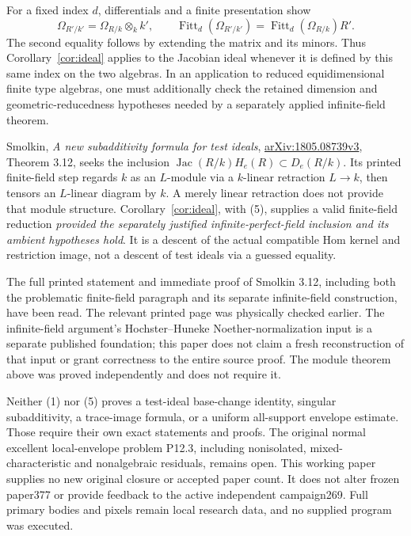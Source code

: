\documentclass[11pt]{article}
\newcommand{\Fitt}{\operatorname{Fitt}}
\begin{document}
For a fixed index $d$, differentials and a finite presentation show
\[
 \Omega_{R'/k'}=\Omega_{R/k}\otimes_k k',\qquad
 \Fitt_d(\Omega_{R'/k'})=\Fitt_d(\Omega_{R/k})R'.          \tag{5}
\]
The second equality follows by extending the matrix and its minors.
Thus Corollary~\ref{cor:ideal} applies to the Jacobian ideal whenever
it is defined by this same index on the two algebras. In an application
to reduced equidimensional finite type algebras, one must additionally
check the retained dimension and geometric-reducedness hypotheses
needed by a separately applied infinite-field theorem.

Smolkin, \emph{A new subadditivity formula for test ideals},
\href{https://arxiv.org/abs/1805.08739v3}{arXiv:1805.08739v3},
Theorem 3.12, seeks the inclusion
$\operatorname{Jac}(R/k) H_e(R)\subset D_e(R/k)$.
Its printed finite-field step regards $k$ as an $L$-module via a
$k$-linear retraction $L\to k$, then tensors an $L$-linear diagram
by $k$. A merely linear retraction does not provide that module
structure. Corollary~\ref{cor:ideal}, with (5), supplies a valid
finite-field reduction \emph{provided the separately justified
infinite-perfect-field inclusion and its ambient hypotheses hold}.
It is a descent of the actual compatible Hom kernel and restriction
image, not a descent of test ideals via a guessed equality.

The full printed statement and immediate proof of Smolkin 3.12,
including both the problematic finite-field paragraph and its separate
infinite-field construction, have been read. The relevant printed
page was physically checked earlier. The infinite-field argument's
Hochster--Huneke Noether-normalization input is a separate published
foundation; this paper does not claim a fresh reconstruction of that
input or grant correctness to the entire source proof. The module
theorem above was proved independently and does not require it.

Neither (1) nor (5) proves a test-ideal base-change identity,
singular subadditivity, a trace-image formula, or a uniform all-support
envelope estimate. Those require their own exact statements and proofs.
The original normal excellent local-envelope problem P12.3, including
nonisolated, mixed-characteristic and nonalgebraic residuals, remains
open. This working paper supplies no new original closure or accepted
paper count. It does not alter frozen paper377 or provide feedback to
the active independent campaign269. Full primary bodies and pixels
remain local research data, and no supplied program was executed.
\end{document}
